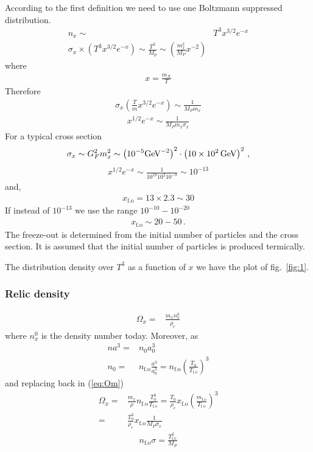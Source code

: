 \documentclass[12pt,letterpaper]{article}
\begin{document}
According to the first definition we need to use one Boltzmann
suppressed distribution.
\begin{align*}
  n_x\sim& T^3 x^{3/2}e^{-x}\nonumber\\
  \sigma_x\times \left( T^3x^{3/2}e^{-x} \right)\sim
  \frac{T^2}{M_p}\sim \left( \frac{m_x^2}{M_P} x^{-2} \right)
\end{align*}
where
\begin{align*}
  x=\frac{m_X}{T}
\end{align*}
Therefore
\begin{align*}
  \sigma_x \left( \frac{T}{m}x^{3/2} e^{-x} \right)\sim \frac{1}{M_P m_x}
\end{align*}
\begin{align*}
  x^{1/2}e^{-x}\sim \frac{1}{M_P m_x \sigma_x}
\end{align*}
For a typical cross section
\begin{align*}
  \sigma_x\sim G_F^2 m_x^2\sim \left( 10^{-5} \text{GeV}^{-2}
  \right)^2\cdot \left( \SI{10E2}{GeV} \right)^2\,,
\end{align*}
\begin{align*}
  x^{1/2}e^{-x}\sim \frac{1}{10^{18} 10^{2} 10^{-8}}\sim 10^{-13}
\end{align*}
and,
\begin{align*}
  x_{\text{f.o}}=13\times 2.3\sim 30
\end{align*}
If instead of $10^{-13}$ we use the range $10^{-10}-10^{-20}$
\begin{align*}
  x_{\text{f.o}}\sim 20-50\,.
\end{align*}
The freeze-out is determined from the initial number of particles and
the cross section. It is assumed that the initial number of particles
is produced termically.

The distribution density over $T^3$ as a function of  $x$ we have the
plot of fig.~\ref{fig:1}.


\subsubsection{Relic density}

\begin{align}
\label{eq:Om}
  \Omega_{x}=&\frac{m_x n_x^0}{\rho_c}
\end{align}
where $n_x^0$ is the density number today. Moreover, as
\begin{align*}
  na^3=&n_0 a_0^3 \nonumber\\
 n_0=& n_{\text{f.o}}\frac{a^3}{a_0^3}=n_{\text{f.o}}\left( \frac{T_0}{T_{\text{f.o}}} \right)^3
\end{align*}
and replacing back in (\ref{eq:Om})
\begin{align}
  \Omega_x=&\frac{m_x}{\rho}n_{\text{f.o}}\frac{T_0^3}{T_{\text{f.o}}}
 =\frac{T_0}{\rho_c}x_{\text{f.o}}\left(
   \frac{m_{\text{f.o}}}{T_{\text{f.o}}} \right)^3 \nonumber\\
=& \frac{T_0^3}{\rho_c}x_{\text{f.o}}\frac{1}{M_P \sigma_x}
\end{align}
\begin{align}
  n_{\text{f.o}}\sigma=\frac{T_{\text{f.o}}^2}{M_P}
\end{align}
\end{document}
